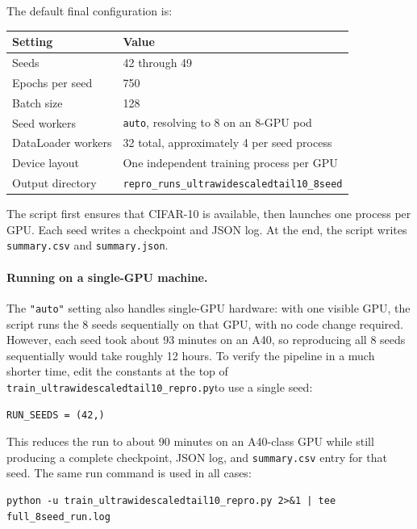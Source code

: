 \documentclass[11pt]{article}
\newcommand{\reprofile}{\texttt{train\_}\allowbreak\texttt{ultrawidescaledtail10\_}\allowbreak\texttt{repro.py}}
\begin{document}
The default final configuration is:

\begin{center}
\begin{tabular}{ll}
\toprule
\textbf{Setting} & \textbf{Value} \\
\midrule
Seeds & 42 through 49 \\
Epochs per seed & 750 \\
Batch size & 128 \\
Seed workers & \texttt{auto}, resolving to 8 on an 8-GPU pod \\
DataLoader workers & 32 total, approximately 4 per seed process \\
Device layout & One independent training process per GPU \\
Output directory & \texttt{repro\_runs\_ultrawidescaledtail10\_8seed} \\
\bottomrule
\end{tabular}
\end{center}

The script first ensures that CIFAR-10 is available, then launches one process per GPU.
Each seed writes a checkpoint and JSON log. At the end, the script writes
\texttt{summary.csv} and \texttt{summary.json}.

\paragraph{Running on a single-GPU machine.}
The \texttt{"auto"} setting also handles single-GPU hardware: with one visible GPU,
the script runs the 8 seeds sequentially on that GPU, with no code change required.
However, each seed took about 93 minutes on an A40, so reproducing all 8 seeds
sequentially would take roughly 12 hours. To verify the pipeline in a much shorter
time, edit the constants at the top of
\reprofile to use a single seed:

\begin{verbatim}
RUN_SEEDS = (42,)
\end{verbatim}

This reduces the run to about 90 minutes on an A40-class GPU while still producing a
complete checkpoint, JSON log, and \texttt{summary.csv} entry for that seed. The same run
command is used in all cases:

\begin{verbatim}
python -u train_ultrawidescaledtail10_repro.py 2>&1 | tee full_8seed_run.log
\end{verbatim}
\end{document}
